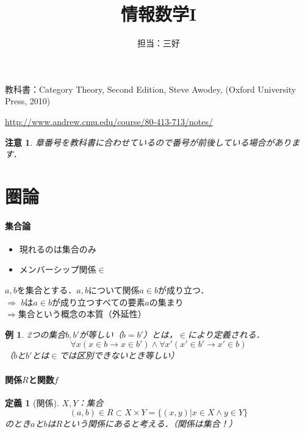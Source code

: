 \documentclass[dvipdfmx,a4j,10pt]{jsarticle}
\title{情報数学I}
\author{担当：三好}
\theoremstyle{mystyle1}
\theoremstyle{mystyle2}
\newtheorem{dfn*}{定義}
\newtheorem{example}{例}
\newtheorem{note*}{注意}
\begin{document}
\maketitle
教科書：Category Theory, Second Edition, Steve Awodey, (Oxford University Press, 2010)

\url{http://www.andrew.cmu.edu/course/80-413-713/notes/}

\begin{note*}
	章番号を教科書に合わせているので番号が前後している場合があります．
\end{note*}

\tableofcontents%

\newpage

\section{圏論}

\paragraph{集合論}

\begin{itemize}
	\item 現れるのは集合のみ
	\item メンバーシップ関係$\in$
\end{itemize}

$a,b$を集合とする．$a,b$について関係$a\in b$が成り立つ．\\
$\Rightarrow$ $b$は$a\in b$が成り立つすべての要素$a$の集まり\\
$\Rightarrow$集合という概念の本質（外延性）

\begin{example}
	2つの集合$b,b'$が等しい（$b=b'$）とは，$\in$により定義される．
	\[
		\forall x(x\in b\to x\in b')\land \forall x'(x'\in b'\to x'\in b)
	\]
	（$b$と$b'$とは$\in$では区別できないとき等しい）
\end{example}

\paragraph{関係$R$と関数$f$}

\begin{dfn*}[関係]

	$X,Y$：集合
	\[
		(a,b)\in R\subset X\times Y=\{(x,y)|x\in X\land y\in Y\}
	\]
	のとき$a$と$b$は$R$という関係にあると考える．（関係は集合！）
\end{dfn*}
\end{document}
